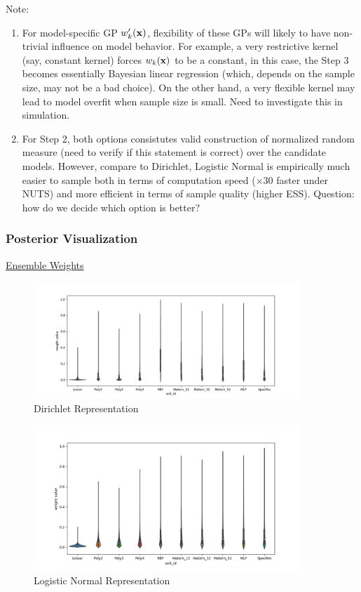 \documentclass[11pt]{article}
\theoremstyle{definition}
\begin{document}
Note:
\begin{enumerate}
\item For model-specific GP $w'_k({\bf x})$, flexibility of these GPs will likely to  have non-trivial influence on model behavior. For example, a very restrictive kernel (say, constant kernel) forces $w_k({\bf x})$ to be a constant, in this case, the Step 3 becomes essentially Bayesian linear regression (which, depends on the sample size, may not be a bad choice). On the other hand, a very flexible kernel may lead to model overfit when sample size is small. Need to investigate this in simulation.
\item For Step 2, both options consistutes valid construction of normalized random measure {\color{red} (need to verify if this statement is correct)} over the candidate models. However, compare to Dirichlet, Logistic Normal is empirically much easier to sample both in terms of computation speed ($\times$30 faster under NUTS) and more efficient in terms of sample quality (higher ESS). {\color{red} Question: how do we decide which option is better?}
\end{enumerate}

\newpage
\subsubsection{\textbf{Posterior Visualization}}

\underline{Ensemble Weights}

\begin{figure}[!ht]
\centering
\includegraphics[width=0.9\textwidth]{"./plot/weight_dist_dirch"}
\caption{Dirichlet Representation}
\end{figure}

\begin{figure}[!ht]
\centering
\includegraphics[width=0.9\textwidth]{"./plot/weight_dist"}
\caption{Logistic Normal Representation}
\end{figure}
\end{document}
